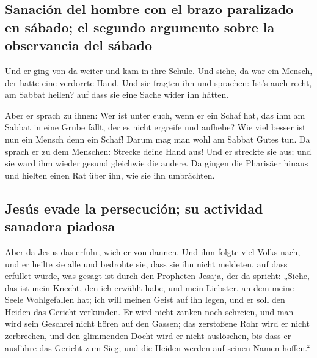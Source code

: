 \hypertarget{sanaciuxf3n-del-hombre-con-el-brazo-paralizado-en-suxe1bado-el-segundo-argumento-sobre-la-observancia-del-suxe1bado}{%
\subsection{Sanación del hombre con el brazo paralizado en sábado; el
segundo argumento sobre la observancia del
sábado}\label{sanaciuxf3n-del-hombre-con-el-brazo-paralizado-en-suxe1bado-el-segundo-argumento-sobre-la-observancia-del-suxe1bado}}

 Und er ging von da weiter und kam in ihre Schule.
 Und siehe, da war ein Mensch, der hatte eine verdorrte
Hand. Und sie fragten ihn und sprachen: Ist's auch recht, am Sabbat
heilen? auf dass sie eine Sache wider ihn hätten.

 Aber er sprach zu ihnen: Wer ist unter euch, wenn er ein
Schaf hat, das ihm am Sabbat in eine Grube fällt, der es nicht ergreife
und aufhebe?  Wie viel besser ist nun ein Mensch denn ein
Schaf! Darum mag man wohl am Sabbat Gutes tun.  Da sprach
er zu dem Menschen: Strecke deine Hand aus! Und er streckte sie aus; und
sie ward ihm wieder gesund gleichwie die andere.  Da
gingen die Pharisäer hinaus und hielten einen Rat über ihn, wie sie ihn
umbrächten.

\hypertarget{jesuxfas-evade-la-persecuciuxf3n-su-actividad-sanadora-piadosa}{%
\subsection{Jesús evade la persecución; su actividad sanadora
piadosa}\label{jesuxfas-evade-la-persecuciuxf3n-su-actividad-sanadora-piadosa}}

 Aber da Jesus das erfuhr, wich er von dannen. Und ihm
folgte viel Volks nach, und er heilte sie alle  und
bedrohte sie, dass sie ihn nicht meldeten,  auf dass
erfüllet würde, was gesagt ist durch den Propheten Jesaja, der da
spricht:  „Siehe, das ist mein Knecht, den ich erwählt
habe, und mein Liebster, an dem meine Seele Wohlgefallen hat; ich will
meinen Geist auf ihn legen, und er soll den Heiden das Gericht
verkünden.  Er wird nicht zanken noch schreien, und man
wird sein Geschrei nicht hören auf den Gassen;  das
zerstoßene Rohr wird er nicht zerbrechen, und den glimmenden Docht wird
er nicht auslöschen, bis dass er ausführe das Gericht zum Sieg;
 und die Heiden werden auf seinen Namen hoffen.``


